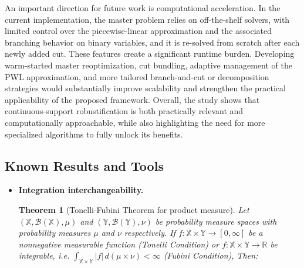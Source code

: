 \documentclass[opre,sglanonrev]{informs4}
\newtheorem{theorem}{Theorem}
\newcommand{\mB}{\mathcal{B}}
\newcommand{\mbX}{\mathbb{X}}
\newcommand{\mbY}{\mathbb{Y}}
\newcommand{\mbR}{\mathbb R}
\begin{document}
{An important direction for future work is computational acceleration. In the current implementation, the master problem relies on off-the-shelf solvers, with limited control over the piecewise-linear approximation and the associated branching behavior on binary variables, and it is re-solved from scratch after each newly added cut. These features create a significant runtime burden. Developing warm-started master reoptimization, cut bundling, adaptive management of the PWL approximation, and more tailored branch-and-cut or decomposition strategies would substantially improve scalability and strengthen the practical applicability of the proposed framework. Overall, the study shows that continuous-support robustification is both practically relevant and computationally approachable, while also highlighting the need for more specialized algorithms to fully unlock its benefits.





\begin{APPENDICES}

\section{Known Results and Tools}\label{appndx: known-results}

\begin{itemize}[leftmargin=1em]
\item[\textbf{A.1}] \textbf{Integration interchangeability.}
\begin{theorem}[Tonelli-Fubini Theorem for product measure\cite{folland1999real}]
Let $(\mbX,\mB(\mbX), \mu)$ and $(\mbY,\mB(\mbY), \nu)$ be probability measure spaces
with probability measures $\mu$ and $\nu$ respectively. If
$f:\mbX\times \mbY\to[0,\infty]$ be a nonnegative measurable function (Tonelli Condition) or 
$f:\mbX\times\mbY\to\mbR$ be integrable, i.e.
$\displaystyle \int_{\mbX\times \mbY} |f|\,d(\mu\times\nu)<\infty$ (Fubini Condition),
Then:


\end{theorem}
\end{itemize}
\end{APPENDICES}}
\end{document}
